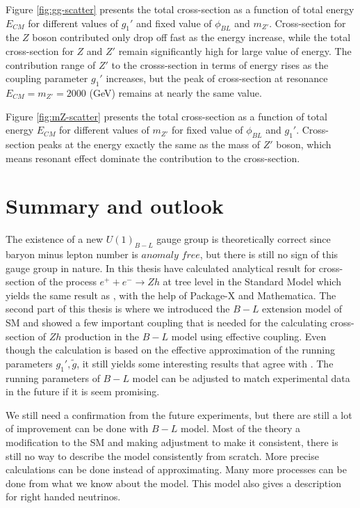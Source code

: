 \documentclass{report}
\numberwithin{equation}{section}
\begin{document}
Figure \ref{fig:gg-scatter} presents the total cross-section as a function of total energy $E_{CM}$ for different values of $g_1'$ and fixed value of $\phi_{BL}$ and $m_{Z'}$. Cross-section for the $Z$ boson contributed only drop off fast as the energy increase, while the total cross-section for $Z$ and $Z'$ remain significantly high for large value of energy. The contribution range of $Z'$ to the crosss-section in terms of energy rises as the coupling parameter $g_1'$ increases, but the peak of cross-section at resonance $E_{CM}=m_{Z'}=2000$ (GeV) remains at nearly the same value.

Figure \ref{fig:mZ-scatter} presents the total cross-section as a function of total energy $E_{CM}$ for different values of $m_{Z'}$ for fixed value of $\phi_{BL}$ and $g_1'$. Cross-section peaks at the energy  exactly the same as the mass of $Z'$ boson, which means resonant effect dominate the contribution to the cross-section.\\
\chapter*{Summary and outlook}
The existence of a new $U(1)_{B-L}$ gauge group is theoretically correct since baryon minus lepton number is $anomaly$ $free$, but there is still no sign of this gauge group in nature.
In this thesis have calculated analytical result for cross-section of the process $e^++e^-\rightarrow Zh$ at tree level in the Standard Model which yields the same result as \cite{Denner:1992bc}, with the help of Package-X and Mathematica. The second part of this thesis is where we introduced the $B-L$ extension model of SM and showed a few important coupling that is needed for the calculating cross-section of $Zh$ production in the $B-L$ model using effective coupling. Even though the calculation is based on the effective approximation of the running parameters $g_1',\tilde{g}$, it still yields some interesting results that agree with \cite{Gutierrez-Rodriguez:2015qka}. The running parameters of  $B-L$ model can be adjusted to match experimental data in the future if it is seem promising.

We still need a confirmation from the future experiments, but there are still a lot of improvement can be done with $B-L$ model. Most of the theory a modification to the SM and making adjustment to make it consistent, there is still no way to describe the model consistently from scratch. More precise calculations can be done instead of approximating. Many more processes can be done from what we know about the model. This model also gives a description for right handed neutrinos.
\clearpage
{}
\nocite{*}
\printbibliography
\end{document}
